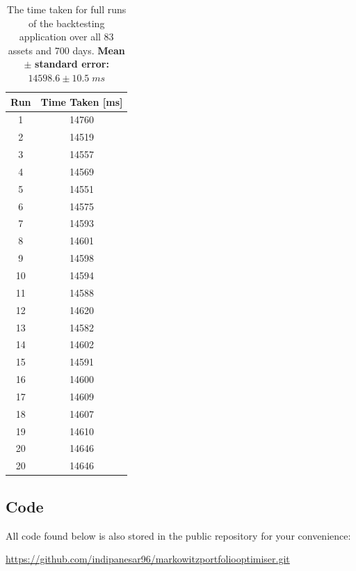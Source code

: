\documentclass{article}
\begin{document}
\begin{center}{
\begin{table}[H]
	\centering
\begin{tabular}{|c c|} 
\hline
Run & Time Taken [ms]  \\ [0.5ex] 
\hline\hline
1 & 14760 \\
\hline
2 & 14519 \\
\hline
3 & 14557 \\
\hline
4 & 14569 \\
\hline
5 & 14551 \\
\hline
6 & 14575 \\
\hline
7 & 14593 \\
\hline
8 & 14601 \\
\hline
9 & 14598 \\
\hline
10 & 14594 \\
\hline
11 & 14588 \\
\hline
12 & 14620 \\
\hline
13 & 14582 \\
\hline
14 & 14602 \\
\hline
15 & 14591 \\
\hline
16 & 14600 \\
\hline
17 & 14609 \\
\hline
18 & 14607 \\
\hline
19 & 14610 \\
\hline
20 & 14646 \\ [1ex] 
20 & 14646 \\ [1ex] 
\hline
\end{tabular}
\caption{The time taken for full runs of the backtesting application over all 83 assets and 700 days. \textbf{Mean} $\pm$ \textbf{ standard error: } $14598.6 \pm 10.5\;ms$}
\label{table:timings}
\end{table}
}
\end{center}

\subsection{Code} 
\label{sec:code}

All code found below is also stored in the public repository for your convenience:

\href{https://github.com/indipanesar96/markowitzportfoliooptimiser.git}{https://github.com/indipanesar96/markowitzportfoliooptimiser.git}
\end{document}
